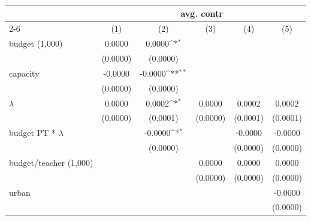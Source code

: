 {
\def\sym#1{\ifmmode^{#1}\else\(^{#1}\)\fi}
\begin{tabular}{l*{5}{c}}
\hline\hline
                    &\multicolumn{5}{c}{avg. contr}                                                                               \\\cmidrule(lr){2-6}
                    &\multicolumn{1}{c}{(1)}         &\multicolumn{1}{c}{(2)}         &\multicolumn{1}{c}{(3)}         &\multicolumn{1}{c}{(4)}         &\multicolumn{1}{c}{(5)}         \\
\hline
budget (1,000)      &      0.0000         &      0.0000\sym{*}  &                     &                     &                     \\
                    &    (0.0000)         &    (0.0000)         &                     &                     &                     \\
[1em]
capacity            &     -0.0000         &     -0.0000\sym{**} &                     &                     &                     \\
                    &    (0.0000)         &    (0.0000)         &                     &                     &                     \\
[1em]
$\lambda$           &      0.0000         &      0.0002\sym{*}  &      0.0000         &      0.0002         &      0.0002         \\
                    &    (0.0000)         &    (0.0001)         &    (0.0000)         &    (0.0001)         &    (0.0001)         \\
[1em]
budget PT * $\lambda$&                     &     -0.0000\sym{*}  &                     &     -0.0000         &     -0.0000         \\
                    &                     &    (0.0000)         &                     &    (0.0000)         &    (0.0000)         \\
[1em]
budget/teacher (1,000)&                     &                     &      0.0000         &      0.0000         &      0.0000         \\
                    &                     &                     &    (0.0000)         &    (0.0000)         &    (0.0000)         \\
[1em]
urban               &                     &                     &                     &                     &     -0.0000         \\
                    &                     &                     &                     &                     &    (0.0000)         \\

\end{tabular}}
